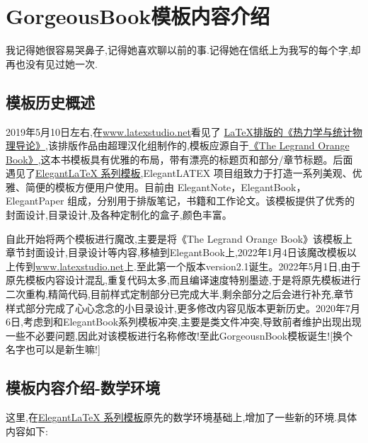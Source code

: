 \chapter{GorgeousBook模板内容介绍}
\begin{center}
    \textcolor[RGB]{255, 0, 0}{\faHeart}我记得她很容易哭鼻子,记得她喜欢聊以前的事.记得她在信纸上为我写的每个字,却再也没有见过她一次.\textcolor[RGB]{255, 0, 0}{\faHeart}
\end{center}
\vspace{-5pt}
\begin{center}
\end{center}

\section{模板历史概述}
2019年5月10日左右,在\href{latexstudio论坛}{www.latexstudio.net}看见了
\href{https://www.latexstudio.net/archives/10715.html}{LaTeX排版的《热力学与统计物理导论》},该排版作品由超理汉化组制作的,模板应源自于\href{http://www.latextemplates.com/template/the-legrand-orange-book}{《The Legrand Orange Book》},这本书模板具有优雅的布局，带有漂亮的标题页和部分/章节标题。后面遇见了\href{https://elegantlatex.org/}{Elegant\LaTeX{} 系列模板},ElegantLATEX 项目组致力于打造一系列美观、优雅、简便的模板方便用户使用。目前由
ElegantNote，ElegantBook，ElegantPaper 组成，分别用于排版笔记，书籍和工作论文。该模板提供了优秀的封面设计,目录设计,及各种定制化的盒子,颜色丰富。

自此开始将两个模板进行魔改,主要是将《The Legrand Orange Book》该模板上章节封面设计,目录设计等内容,移植到ElegantBook上,2022年1月4日该魔改模板以上传到\href{latexstudio论坛}{www.latexstudio.net}上.至此第一个版本version2.1诞生。2022年5月1日,由于原先模板内容设计混乱,重复代码太多,而且编译速度特别墨迹,于是将原先模板进行二次重构,精简代码,目前样式定制部分已完成大半,剩余部分之后会进行补充,章节样式部分完成了心心念念的小目录设计,更多修改内容见版本更新历史。2020年7月6日,考虑到和ElegantBook系列模板冲突,主要是类文件冲突,导致前者维护出现出现一些不必要问题,因此对该模板进行名称修改!至此GorgeousnBook模板诞生![换个名字也可以是新生嘛!]

\section{模板内容介绍-数学环境}
这里,在\href{https://elegantlatex.org/}{Elegant\LaTeX{} 系列模板}原先的数学环境基础上,增加了一些新的环境.具体内容如下:

